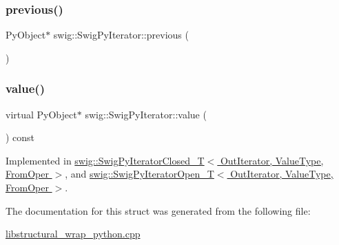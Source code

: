 \mbox{\label{structswig_1_1_swig_py_iterator_ae2a3dea10c5f69c67ef7fbb4e279ad7a}} 
\subsubsection{\texorpdfstring{previous()}{previous()}}
{\footnotesize\ttfamily Py\+Object$\ast$ swig\+::\+Swig\+Py\+Iterator\+::previous (\begin{DoxyParamCaption}{ }\end{DoxyParamCaption})\hspace{0.3cm}{\ttfamily [inline]}}

\mbox{\label{structswig_1_1_swig_py_iterator_a7ba184c8ea37f53dbd75b6678a23f20c}} 
\subsubsection{\texorpdfstring{value()}{value()}}
{\footnotesize\ttfamily virtual Py\+Object$\ast$ swig\+::\+Swig\+Py\+Iterator\+::value (\begin{DoxyParamCaption}{ }\end{DoxyParamCaption}) const\hspace{0.3cm}{\ttfamily [pure virtual]}}



Implemented in \hyperlink{classswig_1_1_swig_py_iterator_closed___t_a4baeeb91419a21260b89205f325e0566}{swig\+::\+Swig\+Py\+Iterator\+Closed\+\_\+\+T$<$ Out\+Iterator, Value\+Type, From\+Oper $>$}, and \hyperlink{classswig_1_1_swig_py_iterator_open___t_aa219f4e29ccea747d23fdb68705a530d}{swig\+::\+Swig\+Py\+Iterator\+Open\+\_\+\+T$<$ Out\+Iterator, Value\+Type, From\+Oper $>$}.



The documentation for this struct was generated from the following file\+:\begin{DoxyCompactItemize}
\item 
\hyperlink{libstructural__wrap__python_8cpp}{libstructural\+\_\+wrap\+\_\+python.\+cpp}\end{DoxyCompactItemize}
